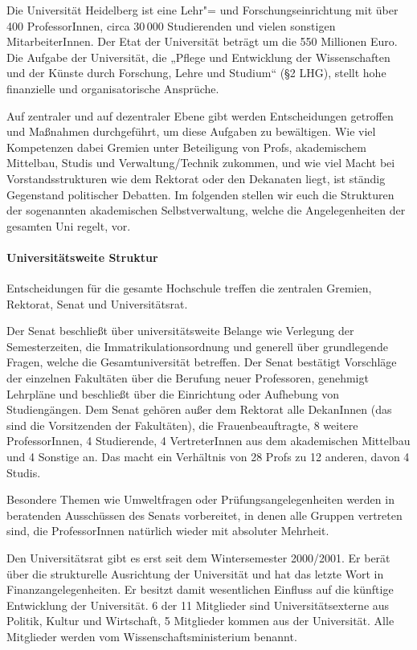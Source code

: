 Die Universität Heidelberg ist eine Lehr"= und Forschungseinrichtung mit über 400 ProfessorInnen, circa 30\,000 Studierenden und vielen sonstigen
MitarbeiterInnen. Der Etat der Universität beträgt um die 550 Millionen Euro. Die Aufgabe der Universität, die „Pflege und Entwicklung der
Wissenschaften und der Künste durch Forschung, Lehre und Studium“ (§2 %
LHG), stellt hohe finanzielle und organisatorische Ansprüche.

Auf zentraler und auf dezentraler Ebene gibt werden Entscheidungen getroffen und Maßnahmen durchgeführt, um diese Aufgaben zu bewältigen. Wie viel Kompetenzen dabei Gremien unter Beteiligung  von Profs, akademischem Mittelbau, Studis und Verwaltung/Technik zukommen, und wie viel Macht bei Vorstandsstrukturen wie dem Rektorat oder den Dekanaten liegt, ist ständig Gegenstand politischer Debatten. Im folgenden stellen wir euch die Strukturen der sogenannten akademischen Selbstverwaltung, welche die Angelegenheiten der gesamten Uni regelt, vor.

\paragraph{Universitätsweite Struktur}

Entscheidungen für die gesamte Hochschule treffen die zentralen Gremien, Rektorat, Senat und Universitätsrat.

Der Senat beschließt über
universitätsweite Belange wie Verlegung der Semesterzeiten, die
Immatrikulationsordnung und generell über grundlegende Fragen, welche die
Gesamtuniversität betreffen. Der Senat bestätigt Vorschläge der einzelnen
Fakultäten über die Berufung neuer Professoren, genehmigt Lehrpläne und
beschließt über die Einrichtung oder Aufhebung von Studiengängen. Dem
Senat gehören außer dem Rektorat alle DekanInnen (das sind die
Vorsitzenden der Fakultäten), die Frauenbeauftragte, 8 weitere ProfessorInnen, 4 Studierende, 4 VertreterInnen aus dem akademischen Mittelbau und 4 Sonstige an. Das macht ein Verhältnis von 28 Profs zu 12 anderen, davon 4 Studis.

Besondere Themen wie Umweltfragen oder
Prüfungsangelegenheiten werden in beratenden Ausschüssen des Senats
vorbereitet, in denen alle Gruppen vertreten sind, die ProfessorInnen
natürlich wieder mit absoluter Mehrheit.

Den Universitätsrat gibt es erst seit dem Wintersemester 2000/2001. Er berät über die strukturelle
Ausrichtung der Universität und hat das letzte Wort in
Finanzangelegenheiten. Er besitzt damit wesentlichen Einfluss auf die
künftige Entwicklung der Universität. 6 der 11 Mitglieder sind
Universitätsexterne aus Politik, Kultur und Wirtschaft, 5 Mitglieder
kommen aus der Universität. Alle Mitglieder werden vom
Wissenschaftsministerium benannt.

